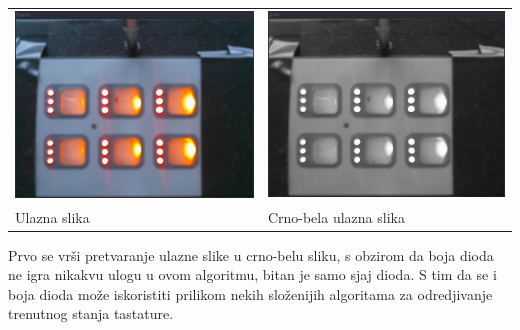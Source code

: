 \documentclass[a4paper,12pt, projekat]{etf}
\begin{document}
        \begin{table}[h!]
            \begin{tabular}{ll}
                \includegraphics[scale=0.3]{original.png} &
                \includegraphics[scale=0.3]{gray.png} \\
                Ulazna slika &
                Crno-bela ulazna slika
            \end{tabular}
        \end{table}

        Prvo se vr\v{s}i pretvaranje ulazne slike u crno-belu sliku, s obzirom
        da boja dioda ne igra nikakvu ulogu u ovom algoritmu, bitan je samo
        sjaj dioda. S tim da se i boja dioda mo\v{z}e iskoristiti
        prilikom nekih slo\v{z}enijih algoritama za odredjivanje trenutnog stanja
        tastature.
\end{document}
